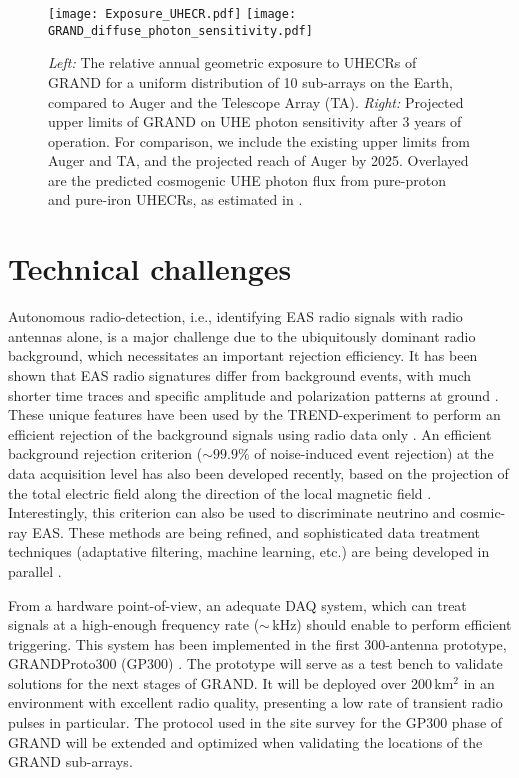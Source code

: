 \documentclass[a4paper,11pt]{article}
\begin{document}
\begin{figure}[t]
\centering
\texttt{[image: Exposure\_UHECR.pdf]}
\texttt{[image: GRAND\_diffuse\_photon\_sensitivity.pdf]}
\caption{{\it Left:} The relative annual geometric exposure to UHECRs of GRAND for a uniform distribution of 10 sub-arrays on the Earth, compared to Auger and the Telescope Array (TA). {\it Right:} Projected upper limits of GRAND on UHE photon sensitivity after 3 years of operation. For comparison, we include the existing upper limits from Auger and TA, and the projected reach of Auger by 2025. Overlayed are the predicted cosmogenic UHE photon flux from pure-proton and pure-iron UHECRs, as estimated in \cite{Sarkar11}. }
\label{fig:CR_gamma_performances}
\end{figure}

\section{Technical challenges}

Autonomous radio-detection, i.e., identifying EAS radio signals with radio antennas alone, is a major challenge due to the ubiquitously dominant radio background, which necessitates an important rejection efficiency. It has been shown that EAS radio signatures differ from background events, with much shorter time traces \cite{Barwick:2016mxm} and specific amplitude \cite{Nelles:2014dja} and polarization patterns at ground \cite{carduner2017codalemaextasis}. These unique features have been used by the TREND-experiment to perform an efficient rejection of the background signals using radio data only \cite{Charrier:2018fle}. An efficient background rejection criterion ($\sim 99.9\%$ of noise-induced event rejection) at the data acquisition level has also been developed recently, based on the projection of the total electric field along the direction of the local magnetic field \cite{Chiche_ICRC21}. Interestingly, this criterion can also be used to discriminate neutrino and cosmic-ray EAS. These methods are being refined, and sophisticated data treatment techniques (adaptative filtering, machine learning, etc.) are being developed in parallel \cite{2018arXiv180901934F,2019JInst..14P4005E}.

From a hardware point-of-view, an adequate DAQ system, which can treat signals at a high-enough frequency rate ($\sim$\,kHz) should enable to perform efficient triggering. This system has been implemented in the first 300-antenna prototype, GRANDProto300 (GP300) \cite{GP300_ICRC2021}. The prototype will serve as a test bench to validate solutions for the next stages of GRAND. It will be deployed over 200\,km$^2$ in an environment with excellent radio quality, presenting a low rate of transient radio pulses in particular. The protocol used in the site survey for the GP300 phase of GRAND will be extended and optimized when validating the locations of the GRAND sub-arrays.
\end{document}

